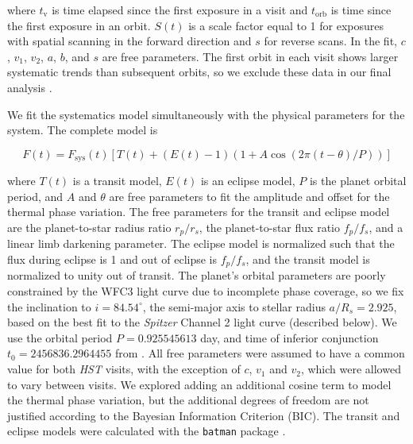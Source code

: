 \documentclass[twocolumn]{aastex61}
\begin{document}
\noindent where $t_\mathrm{v}$ is time elapsed since the first exposure in a visit and $t_\mathrm{orb}$ is time since the first exposure in an orbit. $S(t)$ is a scale factor equal to 1 for exposures with spatial scanning in the forward direction and $s$ for reverse scans. In the fit, $c$, $v_1$, $v_2$, $a$, $b$, and $s$ are free parameters. The first orbit in each visit shows larger systematic trends than subsequent orbits, so we exclude these data in our final analysis \citep[a common practice; see e.g.][]{kreidberg14a}.

We fit the systematics model simultaneously with the physical parameters for the system. The complete model is

\begin{equation}
F(t) = F_\mathrm{sys}(t)\left[T(t) + (E(t) - 1)(1 + A\cos(2\pi(t - \theta)/P))\right]
\label{eq:model}
\end{equation}

\noindent where $T(t)$ is a transit model, $E(t)$ is an eclipse model, $P$ is the planet orbital period, and $A$ and $\theta$ are free parameters to fit the amplitude and offset for the thermal phase variation. The free parameters for the transit and eclipse model are the planet-to-star radius ratio $r_p/r_s$, the planet-to-star flux ratio $f_p/f_s$, and a linear limb darkening parameter. The eclipse model is normalized such that the flux during eclipse is 1 and out of eclipse is $f_p/f_s$, and the transit model is normalized to unity out of transit. The planet's orbital parameters are poorly constrained by the WFC3 light curve due to incomplete phase coverage, so we fix the inclination to $i = 84.54^\circ$, the semi-major axis to stellar radius $a/R_s  = 2.925$, based on the best fit to the \emph{Spitzer} Channel 2 light curve (described below).  We use the orbital period $P = 0.925545613$ day, and time of inferior conjunction $t_0 = 2456836.2964455$ from \cite{southworth15}.  All free parameters were assumed to have a common value for both \emph{HST} visits, with the exception of $c$, $v_1$ and $v_2$, which were allowed to vary between visits. We explored adding an additional cosine term to model the thermal phase variation, but the additional degrees of freedom are not justified according to the Bayesian Information Criterion (BIC). The transit and eclipse models were calculated with the \texttt{batman} package \citep{kreidberg15a}. %
\end{document}
